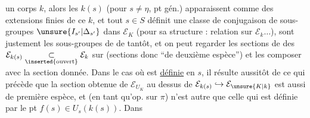 un corps $k$, alors les $k(s)$ (pour $s\ne\eta$, pt gén.) apparaissent comme des extensions finies de ce $k$, et tout $s\in S$ définit une classe de conjugaison de sous-groupes $\unsure{I_{s'}|\Delta_{s'}}$ dans $\mathcal E_K$ (pour sa structure :   relation sur $\mathcal E_k\ldots$),   sont justement les sous-groupes  de   de tantôt, et on peut regarder les sections de   des $\mathcal E_{k(s)}\underset{\inserted{\text{ouvert}}}{\subset}\mathcal E_k$ sur (sections donc ``de deuxième espèce'') et les composer avec la section donnée. Dans le cas où   est \uline{définie} en $s$, il résulte aussitôt de ce qui précède que la section  obtenue de $\mathcal E_{U_K}$ au dessus de $\mathcal E_{k(s)}\hookrightarrow\mathcal E_{\unsure{K|k}}$ est aussi de première espèce, et  (en tant qu'op.   sur $\pi$)  n'est autre que celle qui est définie par le pt $f(s)\in U_s(k(s))$. Dans
